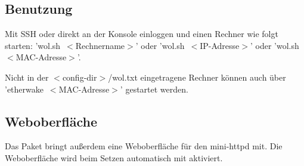 \subsection{Benutzung}

Mit SSH oder direkt an der Konsole einloggen und einen Rechner wie folgt starten:
'wol.sh~$<$Rechnername$>$' oder 'wol.sh~$<$IP-Adresse$>$' oder 'wol.sh~$<$MAC-Adresse$>$'.

Nicht in der $<$config-dir$>$/wol.txt eingetragene Rechner können auch über
'etherwake~$<$MAC-Adresse$>$'
gestartet werden.

\subsection{Weboberfläche}

    Das Paket bringt außerdem eine Weboberfläche für den mini-httpd mit.
    Die Weboberfläche wird beim Setzen  
    automatisch mit aktiviert.
